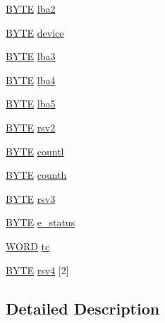\begin{DoxyCompactItemize}
\item 
\hyperlink{ahci_8h_aae9749d96e15ccb4f482dd5f55d98f9b}{B\+Y\+TE} \hyperlink{structtagFIS__PIO__SETUP_a5d2fb825f231cbf7eda993e2a3fdd294}{lba2}
\item 
\hyperlink{ahci_8h_aae9749d96e15ccb4f482dd5f55d98f9b}{B\+Y\+TE} \hyperlink{structtagFIS__PIO__SETUP_a217150d92a7e0d22cdef75c4756e593e}{device}
\item 
\hyperlink{ahci_8h_aae9749d96e15ccb4f482dd5f55d98f9b}{B\+Y\+TE} \hyperlink{structtagFIS__PIO__SETUP_aaa1fc42f0a6f167687ed548f3e01a008}{lba3}
\item 
\hyperlink{ahci_8h_aae9749d96e15ccb4f482dd5f55d98f9b}{B\+Y\+TE} \hyperlink{structtagFIS__PIO__SETUP_a81a31c338ddb24d5ce67d78b7eb7ec62}{lba4}
\item 
\hyperlink{ahci_8h_aae9749d96e15ccb4f482dd5f55d98f9b}{B\+Y\+TE} \hyperlink{structtagFIS__PIO__SETUP_a0cd148b1f4ef5ed9973910e7629674a7}{lba5}
\item 
\hyperlink{ahci_8h_aae9749d96e15ccb4f482dd5f55d98f9b}{B\+Y\+TE} \hyperlink{structtagFIS__PIO__SETUP_a8e5608f593aa7860210547b4476264ef}{rsv2}
\item 
\hyperlink{ahci_8h_aae9749d96e15ccb4f482dd5f55d98f9b}{B\+Y\+TE} \hyperlink{structtagFIS__PIO__SETUP_a630c3c21d33cd057f165187017d478f2}{countl}
\item 
\hyperlink{ahci_8h_aae9749d96e15ccb4f482dd5f55d98f9b}{B\+Y\+TE} \hyperlink{structtagFIS__PIO__SETUP_a6e011ecbdb7acf1f23c4375dd00ae972}{counth}
\item 
\hyperlink{ahci_8h_aae9749d96e15ccb4f482dd5f55d98f9b}{B\+Y\+TE} \hyperlink{structtagFIS__PIO__SETUP_a669462ca1527b6ae8190c682b73b4f39}{rsv3}
\item 
\hyperlink{ahci_8h_aae9749d96e15ccb4f482dd5f55d98f9b}{B\+Y\+TE} \hyperlink{structtagFIS__PIO__SETUP_a5efd3791b4061170c57c4453fbb7ecf8}{e\+\_\+status}
\item 
\hyperlink{ahci_8h_ab24077addd3b7b13e086987ff296552c}{W\+O\+RD} \hyperlink{structtagFIS__PIO__SETUP_af51569c7c38a1ba320ccb3e4481dcdc6}{tc}
\item 
\hyperlink{ahci_8h_aae9749d96e15ccb4f482dd5f55d98f9b}{B\+Y\+TE} \hyperlink{structtagFIS__PIO__SETUP_ad567b4c1d37c0cc2428f68e63d947423}{rsv4} \mbox{[}2\mbox{]}
\end{DoxyCompactItemize}


\subsection{Detailed Description}


